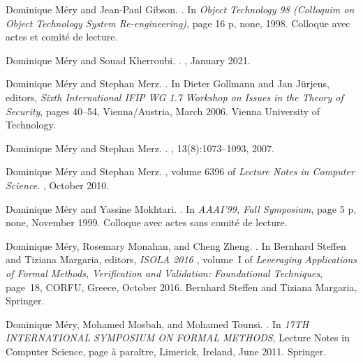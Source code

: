 \documentclass[ 12pt]{article}
\begin{document}
\begin{thebibliography}{100}
Dominique M{\'e}ry and Jean-Paul Gibson.
.
\newblock In {\em {Object Technology 98 (Colloquim on Object Technology System
  Re-engineering)}}, page 16 p, none, 1998.
\newblock Colloque avec actes et comit{\'e} de lecture.

Dominique M{\'e}ry and Souad Kherroubi.
.
, January 2021.

Dominique M{\'e}ry and Stephan Merz.
.
\newblock In Dieter Gollmann and Jan J{\"u}rjens, editors, {\em {Sixth
  International IFIP WG 1.7 Workshop on Issues in the Theory of Security}},
  pages 40--54, Vienna/Austria, March 2006. {Vienna University of Technology}.

Dominique M{\'e}ry and Stephan Merz.
.
, 13(8):1073--1093,
  2007.

Dominique M{\'e}ry and Stephan Merz.
, volume 6396 of {\em Lecture Notes
  in Computer Science}.
, October 2010.

Dominique M{\'e}ry and Yassine Mokhtari.
.
\newblock In {\em {AAAI'99, Fall Symposium}}, page 5 p, none, November 1999.
\newblock Colloque avec actes sans comit{\'e} de lecture.

Dominique M{\'e}ry, Rosemary Monahan, and Cheng Zheng.
.
\newblock In Bernhard Steffen and Tiziana Margaria, editors, {\em {ISOLA 2016
  }}, volume~I of {\em Leveraging Applications of Formal Methods, Verification
  and Validation: Foundational Techniques}, page~18, CORFU, Greece, October
  2016. {Bernhard Steffen and Tiziana Margaria}, {Springer}.

Dominique M{\'e}ry, Mohamed Mosbah, and Mohamed Tounsi.
.
\newblock In {\em {17TH INTERNATIONAL SYMPOSIUM ON FORMAL METHODS}}, Lecture
  Notes in Computer Science, page {\`a} para{\^i}tre, Limerick, Ireland, June
  2011. {Springer}.


\end{thebibliography}
\end{document}
